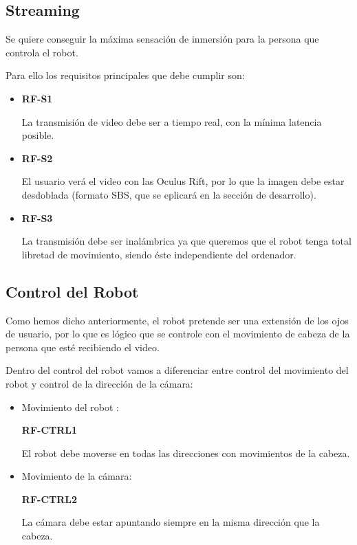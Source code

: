 \documentclass[twoside, 12pt]{epstfg}
\begin{document}
\subsection{Streaming}
Se quiere conseguir la máxima sensación de inmersión para la persona que controla el robot.

Para ello los requisitos principales que debe cumplir son:

\begin{itemize}
	\item\textbf{RF-S1}
	
	La transmisión de video debe ser  a tiempo real, con la mínima latencia posible.
	
	\item\textbf{RF-S2}
	
	El usuario verá el video con  las Oculus Rift, por lo que la imagen debe estar desdoblada (formato SBS, que se eplicará en la sección de desarrollo).
	
	\item\textbf{RF-S3}
	
	La transmisión debe ser inalámbrica ya que queremos que el robot tenga total libretad de movimiento, siendo éste independiente del ordenador.
	
	
\end{itemize}



\subsection{Control del Robot}

Como hemos dicho anteriormente, el robot pretende ser una extensión de los ojos de usuario, por lo que es lógico que se controle con el movimiento de cabeza de la persona que esté recibiendo el video.

Dentro del control del robot vamos a diferenciar entre control del movimiento del robot y control de la dirección de la cámara:

\begin{itemize}
	\item Movimiento del robot :
	
	\textbf{RF-CTRL1}
	
	El robot debe moverse en todas las direcciones con movimientos de la cabeza.
	\item  Movimiento de la cámara:
	
	\textbf{RF-CTRL2}
	
	La cámara debe estar apuntando siempre en la misma dirección que la cabeza.
	
\end{itemize}
\end{document}
